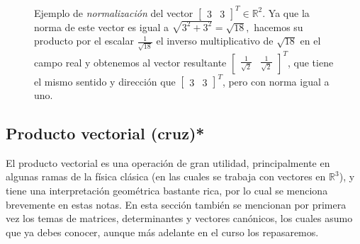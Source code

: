 \documentclass[12pt]{article}
\begin{document}
\begin{figure}[h!]
    \centering
        \caption{Ejemplo de \emph{normalización} del vector $\begin{bmatrix}3&3\end{bmatrix}^T\in\mathbb{R}^2$. Ya que la norma de este vector es igual a $\sqrt{3^2+3^2}=\sqrt{18},$ hacemos su producto por el escalar $\frac{1}{\sqrt{18}}$ \textemdash el inverso multiplicativo de $\sqrt{18}$ en el campo real\textemdash\hspace{0.5mm}  y obtenemos al vector resultante $\begin{bmatrix}\frac{1}{\sqrt{2}}&\frac{1}{\sqrt{2}}\end{bmatrix}^T$, que tiene el mismo sentido y dirección que $\begin{bmatrix}3&3\end{bmatrix}^T$, pero con norma igual a uno.}
    \label{fig:Correspondencias_del_plano_cartesiano}
\end{figure}

 \subsection{Producto vectorial (cruz)*} 

El producto vectorial es una operación de gran utilidad, principalmente en algunas ramas de la física clásica (en las cuales se trabaja con vectores en $\mathbb{R}^3$), y tiene una interpretación geométrica bastante rica, por lo cual se menciona brevemente en estas notas. En esta sección también se mencionan por primera vez los temas de matrices, determinantes y vectores canónicos, los cuales asumo que ya debes conocer, aunque más adelante en el curso los repasaremos.
\end{document}
